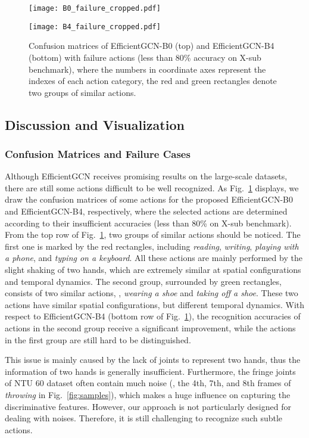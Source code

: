 \documentclass[10pt,journal,compsoc]{IEEEtran}
\begin{document}
\begin{figure}[t]
  \centerline{\texttt{[image: B0\_failure\_cropped.pdf]}}
  \centerline{\texttt{[image: B4\_failure\_cropped.pdf]}}
  \vspace{-0.4cm}
  \caption{Confusion matrices of EfficientGCN-B0 (top) and EfficientGCN-B4 (bottom) with failure actions (less than 80\% accuracy on X-sub benchmark), where the numbers in coordinate axes represent the indexes of each action category, the {\color{red}red} and {\color{darkgreen}green} rectangles denote two groups of similar actions. \bv}\label{fig:cm}
\end{figure}

\subsection{Discussion and Visualization}
\label{ssec:discuss}

\subsubsection{Confusion Matrices and Failure Cases}
\label{sssec:failure}

Although EfficientGCN receives promising results on the large-scale datasets, there are still some actions difficult to be well recognized. As Fig.~\ref{fig:cm} displays, we draw the confusion matrices of some actions for the proposed EfficientGCN-B0 and EfficientGCN-B4, respectively, where the selected actions are determined according to their insufficient accuracies (less than 80\% on X-sub benchmark). From the top row of Fig.~\ref{fig:cm}, two groups of similar actions should be noticed. The first one is marked by the red rectangles, including {\it reading}, {\it writing}, {\it playing with a phone}, and {\it typing on a keyboard}. All these actions are mainly performed by the slight shaking of two hands, which are extremely similar at spatial configurations and temporal dynamics. The second group, surrounded by green rectangles, consists of two similar actions, \ie, {\it wearing a shoe} and {\it taking off a shoe}. These two actions have similar spatial configurations, but different temporal dynamics. With respect to EfficientGCN-B4 (bottom row of Fig.~\ref{fig:cm}), the recognition accuracies of actions in the second group receive a significant improvement, while the actions in the first group are still hard to be distinguished.

This issue is mainly caused by the lack of joints to represent two hands, thus the information of two hands is generally insufficient. Furthermore, the fringe joints of NTU 60 dataset often contain much noise (\eg, the 4th, 7th, and 8th frames of {\it throwing} in Fig.~\ref{fig:samples}), which makes a huge influence on capturing the discriminative features. However, our approach is not particularly designed for dealing with noises. Therefore, it is still challenging to recognize such subtle actions.
\end{document}
